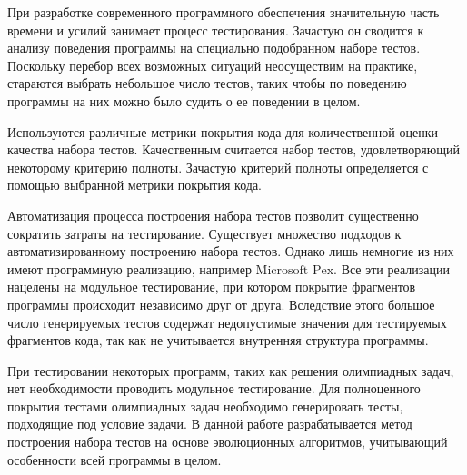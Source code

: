 \startprefacepage

При разработке современного программного обеспечения значительную часть времени и усилий занимает процесс тестирования. Зачастую он сводится к анализу поведения 
программы на специально подобранном наборе тестов. Поскольку перебор всех возможных ситуаций неосуществим на практике, стараются выбрать небольшое число 
тестов, таких чтобы по поведению программы на них можно было судить о ее поведении в целом.

Используются различные метрики покрытия кода для количественной оценки качества набора тестов. Качественным считается набор тестов, удовлетворяющий некоторому 
критерию полноты. Зачастую критерий полноты определяется с помощью выбранной метрики покрытия кода.

Автоматизация процесса построения набора тестов позволит существенно сократить затраты на тестирование. Существует множество подходов к автоматизированному 
построению набора тестов. Однако лишь немногие из них имеют программную реализацию, например $\text{Microsoft Pex}$. Все эти реализации нацелены на модульное 
тестирование, при котором покрытие фрагментов программы происходит независимо друг от друга. Вследствие этого большое число генерируемых тестов содержат 
недопустимые значения для тестируемых фрагментов кода, так как не учитывается внутренняя структура программы. 

При тестировании некоторых программ, таких как решения олимпиадных задач, нет необходимости проводить модульное тестирование. Для полноценного покрытия тестами 
олимпиадных задач необходимо генерировать тесты, подходящие под условие задачи. В данной работе разрабатывается метод построения набора тестов на основе 
эволюционных алгоритмов, учитывающий особенности всей программы в целом. 